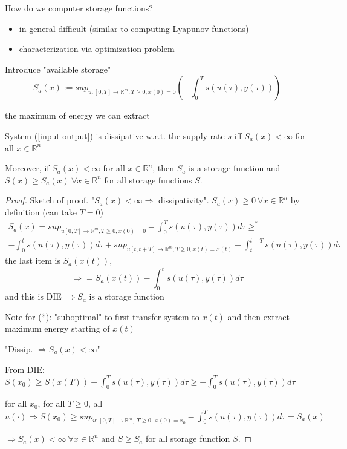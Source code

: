 How do we computer storage functions?
\begin{itemize}
\item in general difficult (similar to computing Lyapunov functions)
\item characterization via optimization problem
\end{itemize}

Introduce "available storage"
\begin{equation*}
S_a(x) := sup_{u:[0,T] \to \mathbb{R}^m, T \geq 0, x(0) = 0} (- \int_0^Ts(u(\tau),y(\tau)))
\end{equation*}

the maximum of energy we can extract

\begin{Theorem}
System (\ref{input-output}) is dissipative w.r.t. the supply rate $s$ iff $S_a(x) < \infty$ for all $x \in \mathbb{R}^n$

Moreover, if $S_a(x) < \infty$ for all $x \in \mathbb{R}^n$, then $S_a$ is a storage function and $S(x) \geq S_a(x) \ \forall x \in \mathbb{R}^n$ for all storage functions $S$.

\begin{proof}
Sketch of proof. "$S_a(x) < \infty \Rightarrow$ dissipativity". $S_a(x) \geq 0 \ \forall x \in \mathbb{R}^n$ by definition (can take $T=0$)
\begin{equation*}
\begin{split}
S_a(x) = sup_{u[0,T] \to \mathbb{R}^m, T \geq 0, x(0) = 0}- \int_0^Ts(u(\tau), y(\tau))d\tau \geq^* \\ 
- \int_0^t s(u(\tau), y(\tau))d\tau + sup_{u[t,t+T] \to \mathbb{R}^m, T \geq 0, x(t) = x(t)} - \int_t^{t+T}s(u(\tau), y(\tau))d\tau
\end{split}
\end{equation*} 
the last item is $S_a(x(t))$, 
\begin{equation*}
\Rightarrow = S_a(x(t)) - \int_0^ts(u(\tau), y(\tau))d\tau
\end{equation*}
and this is DIE $\Rightarrow S_a$ is a storage function

Note for (*): "suboptimal" to first transfer system to $x(t)$ and then extract maximum energy starting of $x(t)$

"Dissip. $\Rightarrow S_a(x) < \infty$"

From DIE: $S(x_0) \geq S(x(T)) - \int_0^Ts(u(\tau), y(\tau))d\tau \geq - \int_0^T s(u(\tau),y(\tau))d\tau$

for all $x_0$, for all $T \geq 0$, all $u(\cdot) \Rightarrow S(x_0) \geq sup_{u:[0,T] \to \mathbb{R}^m, \ T \geq 0, \ x(0) = x_0} - \int_0^Ts(u(\tau),y(\tau))d\tau = S_a(x)$

$\Rightarrow S_a(x) < \infty \ \forall x \in \mathbb{R}^n$ and $S \geq S_a$ for all storage function $S$. 
\end{proof}
\end{Theorem}

